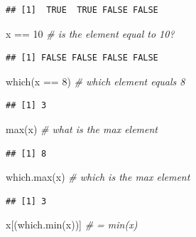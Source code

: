 \documentclass[
  11pt,
]{book}
\newenvironment{Shaded}{\begin{snugshade}}{\end{snugshade}}
\newcommand{\CommentTok}[1]{\textcolor[rgb]{0.56,0.35,0.01}{\textit{#1}}}
\newcommand{\DecValTok}[1]{\textcolor[rgb]{0.00,0.00,0.81}{#1}}
\newcommand{\FunctionTok}[1]{\textcolor[rgb]{0.00,0.00,0.00}{#1}}
\newcommand{\NormalTok}[1]{#1}
\newcommand{\SpecialCharTok}[1]{\textcolor[rgb]{0.00,0.00,0.00}{#1}}
\begin{document}
\begin{verbatim}
## [1]  TRUE  TRUE FALSE FALSE
\end{verbatim}

\begin{Shaded}
\begin{Highlighting}[]
\NormalTok{x }\SpecialCharTok{==} \DecValTok{10} \CommentTok{\# is the element equal to 10?}
\end{Highlighting}
\end{Shaded}

\begin{verbatim}
## [1] FALSE FALSE FALSE FALSE
\end{verbatim}

\begin{Shaded}
\begin{Highlighting}[]
\FunctionTok{which}\NormalTok{(x }\SpecialCharTok{==} \DecValTok{8}\NormalTok{) }\CommentTok{\# which element equals 8 }
\end{Highlighting}
\end{Shaded}

\begin{verbatim}
## [1] 3
\end{verbatim}

\begin{Shaded}
\begin{Highlighting}[]
\FunctionTok{max}\NormalTok{(x) }\CommentTok{\# what is the max element}
\end{Highlighting}
\end{Shaded}

\begin{verbatim}
## [1] 8
\end{verbatim}

\begin{Shaded}
\begin{Highlighting}[]
\FunctionTok{which.max}\NormalTok{(x) }\CommentTok{\# which is the max element }
\end{Highlighting}
\end{Shaded}

\begin{verbatim}
## [1] 3
\end{verbatim}

\begin{Shaded}
\begin{Highlighting}[]
\NormalTok{x[(}\FunctionTok{which.min}\NormalTok{(x))] }\CommentTok{\#  = min(x)}
\end{Highlighting}
\end{Shaded}
\end{document}
